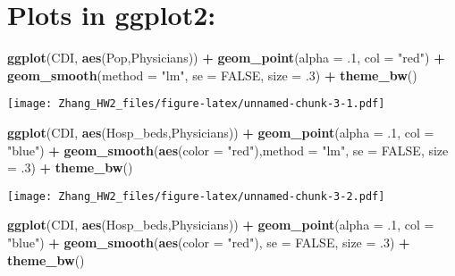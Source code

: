 \documentclass[]{article}
\newenvironment{Shaded}{\begin{snugshade}}{\end{snugshade}}
\newcommand{\DataTypeTok}[1]{\textcolor[rgb]{0.13,0.29,0.53}{#1}}
\newcommand{\FloatTok}[1]{\textcolor[rgb]{0.00,0.00,0.81}{#1}}
\newcommand{\KeywordTok}[1]{\textcolor[rgb]{0.13,0.29,0.53}{\textbf{#1}}}
\newcommand{\NormalTok}[1]{#1}
\newcommand{\OperatorTok}[1]{\textcolor[rgb]{0.81,0.36,0.00}{\textbf{#1}}}
\newcommand{\OtherTok}[1]{\textcolor[rgb]{0.56,0.35,0.01}{#1}}
\newcommand{\StringTok}[1]{\textcolor[rgb]{0.31,0.60,0.02}{#1}}
\begin{document}
\hypertarget{plots-in-ggplot2}{%
\section{Plots in ggplot2:}\label{plots-in-ggplot2}}

\begin{Shaded}
\begin{Highlighting}[]
\KeywordTok{ggplot}\NormalTok{(CDI, }\KeywordTok{aes}\NormalTok{(Pop,Physicians)) }\OperatorTok{+}
\StringTok{  }\KeywordTok{geom_point}\NormalTok{(}\DataTypeTok{alpha =} \FloatTok{.1}\NormalTok{, }\DataTypeTok{col =} \StringTok{"red"}\NormalTok{) }\OperatorTok{+}
\StringTok{  }\KeywordTok{geom_smooth}\NormalTok{(}\DataTypeTok{method =} \StringTok{"lm"}\NormalTok{, }\DataTypeTok{se =} \OtherTok{FALSE}\NormalTok{, }\DataTypeTok{size =} \FloatTok{.3}\NormalTok{) }\OperatorTok{+}\StringTok{ }
\StringTok{  }\KeywordTok{theme_bw}\NormalTok{()}
\end{Highlighting}
\end{Shaded}

\texttt{[image: Zhang\_HW2\_files/figure-latex/unnamed-chunk-3-1.pdf]}

\begin{Shaded}
\begin{Highlighting}[]
\KeywordTok{ggplot}\NormalTok{(CDI, }\KeywordTok{aes}\NormalTok{(Hosp_beds,Physicians)) }\OperatorTok{+}
\StringTok{  }\KeywordTok{geom_point}\NormalTok{(}\DataTypeTok{alpha =} \FloatTok{.1}\NormalTok{, }\DataTypeTok{col =} \StringTok{"blue"}\NormalTok{) }\OperatorTok{+}
\StringTok{  }\KeywordTok{geom_smooth}\NormalTok{(}\KeywordTok{aes}\NormalTok{(}\DataTypeTok{color =} \StringTok{"red"}\NormalTok{),}\DataTypeTok{method =} \StringTok{"lm"}\NormalTok{, }\DataTypeTok{se =} \OtherTok{FALSE}\NormalTok{, }\DataTypeTok{size =} \FloatTok{.3}\NormalTok{) }\OperatorTok{+}\StringTok{ }
\StringTok{  }\KeywordTok{theme_bw}\NormalTok{()}
\end{Highlighting}
\end{Shaded}

\texttt{[image: Zhang\_HW2\_files/figure-latex/unnamed-chunk-3-2.pdf]}

\begin{Shaded}
\begin{Highlighting}[]
\KeywordTok{ggplot}\NormalTok{(CDI, }\KeywordTok{aes}\NormalTok{(Hosp_beds,Physicians)) }\OperatorTok{+}
\StringTok{  }\KeywordTok{geom_point}\NormalTok{(}\DataTypeTok{alpha =} \FloatTok{.1}\NormalTok{, }\DataTypeTok{col =} \StringTok{"blue"}\NormalTok{) }\OperatorTok{+}
\StringTok{  }\KeywordTok{geom_smooth}\NormalTok{(}\KeywordTok{aes}\NormalTok{(}\DataTypeTok{color =} \StringTok{"red"}\NormalTok{), }\DataTypeTok{se =} \OtherTok{FALSE}\NormalTok{, }\DataTypeTok{size =} \FloatTok{.3}\NormalTok{) }\OperatorTok{+}
\StringTok{  }\KeywordTok{theme_bw}\NormalTok{()}
\end{Highlighting}
\end{Shaded}
\end{document}
